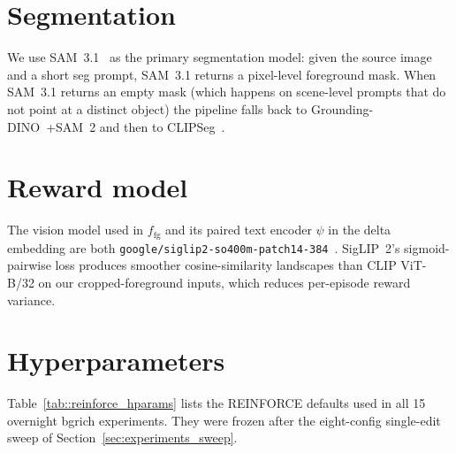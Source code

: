 \section{Segmentation}
\label{sec:methods_seg}

We use SAM~3.1~\cite{ravi2024sam2} as the primary segmentation model: given the source image and a short seg prompt, SAM~3.1 returns a pixel-level foreground mask. When SAM~3.1 returns an empty mask (which happens on scene-level prompts that do not point at a distinct object) the pipeline falls back to Grounding-DINO~\cite{liu2024groundingdino}+SAM~2 and then to CLIPSeg~\cite{luddecke2022image}.

\section{Reward model}

The vision model used in $f_{\text{fg}}$ and its paired text encoder $\psi$ in the delta embedding are both \texttt{google/siglip2-so400m-patch14-384}~\cite{tschannen2025siglip2}. SigLIP~2's sigmoid-pairwise loss produces smoother cosine-similarity landscapes than CLIP ViT-B/32 on our cropped-foreground inputs, which reduces per-episode reward variance.

\section{Hyperparameters}

Table~\ref{tab::reinforce_hparams} lists the REINFORCE defaults used in all 15 overnight bgrich experiments. They were frozen after the eight-config single-edit sweep of Section~\ref{sec:experiments_sweep}.

